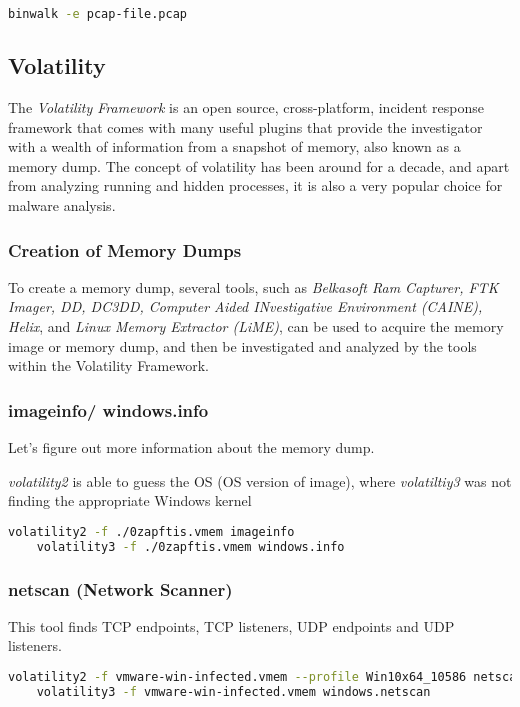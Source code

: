 \begin{lstlisting}[language=bash]
    binwalk -e pcap-file.pcap
\end{lstlisting}

\subsection{Volatility}
The \textit{Volatility Framework} is an open source, cross-platform, incident response framework that comes with many useful plugins that provide the investigator with a wealth of information from a snapshot of memory, also known as a memory dump. The concept of volatility has been around for a decade, and apart from analyzing running and hidden processes, it is also a very popular choice for malware analysis.

\subsubsection{Creation of Memory Dumps}
To create a memory dump, several tools, such as \textit{Belkasoft Ram Capturer, FTK Imager, DD, DC3DD, Computer Aided INvestigative Environment (CAINE), Helix}, and \textit{Linux Memory Extractor (LiME)}, can be used to acquire the memory image or memory dump, and then be investigated and analyzed by the tools within the Volatility Framework.

\subsubsection{imageinfo/ windows.info}
Let's figure out more information about the memory dump.

\textit{volatility2} is able to guess the OS (OS version of image), where \textit{volatiltiy3} was not finding the appropriate Windows kernel

\begin{lstlisting}[language=bash]
    volatility2 -f ./0zapftis.vmem imageinfo
    volatility3 -f ./0zapftis.vmem windows.info
\end{lstlisting}

\subsubsection{netscan (Network Scanner)}
This tool finds TCP endpoints, TCP listeners, UDP endpoints and UDP listeners.

\begin{lstlisting}[language=bash]
    volatility2 -f vmware-win-infected.vmem --profile Win10x64_10586 netscan
    volatility3 -f vmware-win-infected.vmem windows.netscan
\end{lstlisting}

